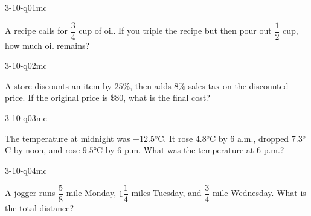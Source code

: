 

\begin{practiceQuestion}{3-10-q01}{mc}
\begin{questionText}
A recipe calls for $\dfrac{3}{4}$ cup of oil. If you triple the recipe but then pour out $\dfrac{1}{2}$ cup, how much oil remains?
\end{questionText}
\end{practiceQuestion}

\begin{practiceQuestion}{3-10-q02}{mc}
\begin{questionText}
A store discounts an item by $25\%$, then adds $8\%$ sales tax on the discounted price. If the original price is $\$80$, what is the final cost?
\end{questionText}
\end{practiceQuestion}

\begin{practiceQuestion}{3-10-q03}{mc}
\begin{questionText}
The temperature at midnight was $-12.5°$C. It rose $4.8°$C by $6$ a.m., dropped $7.3°$C by noon, and rose $9.5°$C by $6$ p.m. What was the temperature at $6$ p.m.?
\end{questionText}
\end{practiceQuestion}

\begin{practiceQuestion}{3-10-q04}{mc}
\begin{questionText}
A jogger runs $\dfrac{5}{8}$ mile Monday, $1\dfrac{1}{4}$ miles Tuesday, and $\dfrac{3}{4}$ mile Wednesday. What is the total distance?
\end{questionText}
\end{practiceQuestion}

